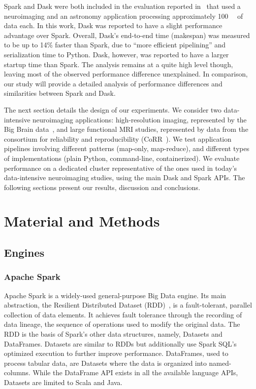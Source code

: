 \documentclass[conference]{IEEEtran}
\begin{document}
Spark and Dask were both included in the evaluation reported
in~\cite{Mehta:17} that used a neuroimaging and an astronomy application
processing approximately \SI{100}{\giga\byte} of data each. In this work, Dask was
reported to have a slight performance advantage over Spark. Overall, Dask's
end-to-end time (makespan) was measured to be up to 14\% faster than Spark,
due to ``more efficient pipelining'' %
and serialization time to
Python. %
Dask, however, was reported to have a larger startup
time than Spark. %
The analysis remains at a quite high level
though, leaving most of the observed performance difference unexplained. In
comparison, our study will provide a detailed analysis of performance
differences and similarities between Spark and Dask.

The next section details the design of our experiments. We consider two
data-intensive neuroimaging applications: high-resolution imaging,
represented by the Big Brain data~\cite{Amunts:13}, and large functional
MRI studies, represented by data from the consortium for reliability and
reproducibility (CoRR~\cite{zuo2014open}). We test application pipelines
involving different patterns (map-only, map-reduce), and different types of
implementations (plain Python, command-line,
containerized). We evaluate performance on a dedicated cluster
representative of the ones used in today's data-intensive neuroimaging
studies, using the main Dask and Spark APIs. The following sections present
our results, discussion and conclusions.



\section{Material and Methods}

\subsection{Engines}

\subsubsection{Apache Spark} Apache Spark is a widely-used 
general-purpose Big Data engine.
Its main abstraction, the Resilient Distributed Dataset
(RDD)~\cite{RDD}, is a fault-tolerant, parallel collection of data elements. It 
achieves fault tolerance through the recording of data lineage, the
sequence of operations used to modify the original data. The RDD is the basis
of Spark's other data structures, namely, Datasets
and DataFrames. Datasets are similar to RDDs but additionally use Spark SQL's
optimized execution to further improve performance. DataFrames, used to process
tabular data, are Datasets where the data is organized into named-columns.
While the DataFrame API exists in all the available language APIs, Datasets are
limited to Scala and Java.
\end{document}
